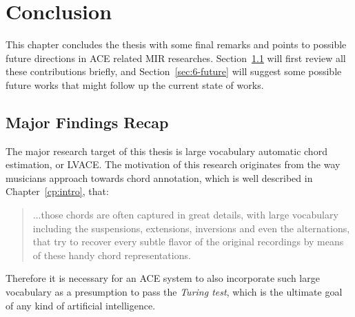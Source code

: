 

\chapter{Conclusion}\label{cp:conclude} %

%



\ifpdf
    \graphicspath{{8/figures/PNG/}{8/figures/PDF/}{8/figures/}}
\else
    \graphicspath{{8/figures/EPS/}{8/figures/}}
\fi


This chapter concludes the thesis with some final remarks and points to possible future directions in ACE related MIR researches. Section~\ref{sec:6-recap} will first review all these contributions briefly, and Section~\ref{sec:6-future} will suggest some possible future works that might follow up the current state of works.

\section{Major Findings Recap} \label{sec:6-recap}
The major research target of this thesis is large vocabulary automatic chord estimation, or LVACE. The motivation of this research originates from the way musicians approach towards chord annotation, which is well described in Chapter~\ref{cp:intro}, that:
\begin{quote}
...those chords are often captured in great details, with large vocabulary including the suspensions, extensions, inversions and even the alternations, that try to recover every subtle flavor of the original recordings by means of these handy chord representations.
\end{quote}
Therefore it is necessary for an ACE system to also incorporate such large vocabulary as a presumption to pass the \textit{Turing test}, which is the ultimate goal of any kind of artificial intelligence.

